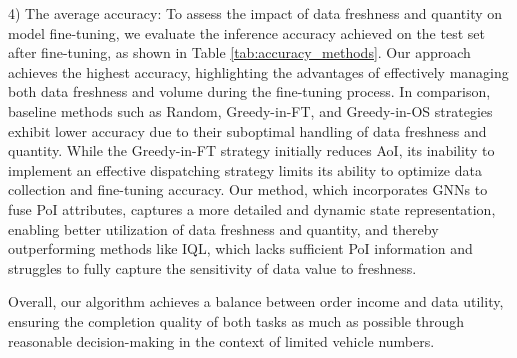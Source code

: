 4) 
The average accuracy:
To assess the impact of data freshness and quantity on model fine-tuning, we evaluate the inference accuracy achieved on the test set after fine-tuning, as shown in Table \ref{tab:accuracy_methods}. Our approach achieves the highest accuracy, highlighting the advantages of effectively managing both data freshness and volume during the fine-tuning process. In comparison, baseline methods such as Random, Greedy-in-FT, and Greedy-in-OS strategies exhibit lower accuracy due to their suboptimal handling of data freshness and quantity. While the Greedy-in-FT strategy initially reduces AoI, its inability to implement an effective dispatching strategy limits its ability to optimize data collection and fine-tuning accuracy. Our method, which incorporates GNNs to fuse PoI attributes, captures a more detailed and dynamic state representation, enabling better utilization of data freshness and quantity, and thereby outperforming methods like IQL, which lacks sufficient PoI information and struggles to fully capture the sensitivity of data value to freshness. 


Overall, our algorithm achieves a balance between order income and data utility, ensuring the completion quality of both tasks as much as possible through reasonable decision-making in the context of limited vehicle numbers.

